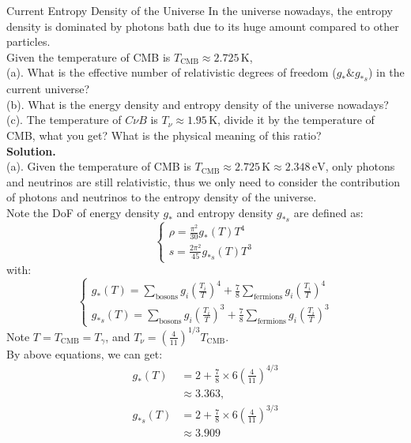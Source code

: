 \bigskip\noindent \bigskip\noindent \bigskip\noindent
\begin{example}{Current Entropy Density of the Universe}{}
    In the universe nowadays, the entropy density is dominated by photons bath due to its huge amount compared to other particles. \\

    Given the temperature of CMB is $T_\text{CMB} \approx 2.725\,\mathrm{K}$, \\
    (a). What is the effective number of relativistic degrees of freedom ($g_* \& g_{*s}$) in the current universe? \\
    (b). What is the energy density and entropy density of the universe nowadays? \\
    (c). The temperature of $C \nu B$ is $T_\nu \approx 1.95\,\mathrm{K}$, divide it by the temperature of CMB, what you get? What is the physical meaning of this ratio? \\


    \bigskip\textbf{Solution.}\quad \\
    (a). Given the temperature of CMB is $T_\text{CMB} \approx 2.725\,\mathrm{K} \approx 2.348\, \mathrm{eV}$, only photons and neutrinos are still relativistic, thus we only need to consider the contribution of photons and neutrinos to the entropy density of the universe. \\
    
    Note the DoF of energy density $g_*$ and entropy density $g_{*s}$ are defined as:
    \[
        \begin{cases}
            \rho = \frac{\pi^2}{30} g_*(T) T^4 \\
            s = \frac{2\pi^2}{45} g_{*s}(T) T^3
        \end{cases}
    \]
    with:
    \[
        \begin{cases}
            g_*(T) = \sum_{\text{bosons}} g_i \left( \frac{T_i}{T} \right)^4 + \frac{7}{8} \sum_{\text{fermions}} g_i \left( \frac{T_i}{T} \right)^4 \\
            g_{*s}(T) = \sum_{\text{bosons}} g_i \left( \frac{T_i}{T} \right)^3 + \frac{7}{8} \sum_{\text{fermions}} g_i \left( \frac{T_i}{T} \right)^3
        \end{cases}
    \]
    Note $T = T_\text{CMB} = T_\gamma$, and $T_\nu = \left( \frac{4}{11} \right)^{1/3} T_\text{CMB}$. \\

    By above equations, we can get:
    \begin{align*}
        g_*(T) &= 2 + \frac{7}{8} \times 6 \left( \frac{4}{11} \right)^{4/3} \\
        &\approx 3.363, \\
        g_{*s}(T) &= 2 + \frac{7}{8} \times 6 \left( \frac{4}{11} \right)^{3/3} \\
        &\approx 3.909
    \end{align*} \\


\end{example}
